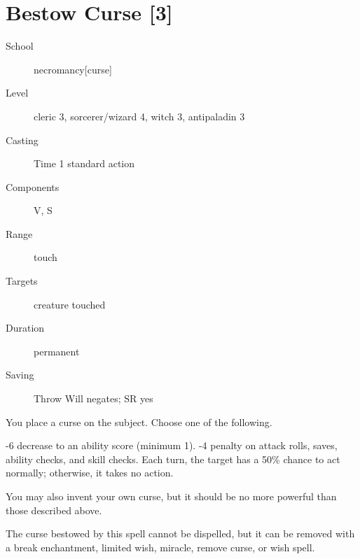 \documentclass[english]{article}
\begin{document}
\section*{Bestow Curse {[}3{]}}
\begin{description}
\item [{School}] necromancy{[}curse{]}
\item [{Level}] cleric 3, sorcerer/wizard 4, witch 3, antipaladin 3
\item [{Casting}] Time 1 standard action
\item [{Components}] V, S
\item [{Range}] touch
\item [{Targets}] creature touched
\item [{Duration}] permanent
\item [{Saving}] Throw Will negates; SR yes
\end{description}
You place a curse on the subject. Choose one of the following.

-6 decrease to an ability score (minimum 1). -4 penalty on attack
rolls, saves, ability checks, and skill checks. Each turn, the target
has a 50\% chance to act normally; otherwise, it takes no action.

You may also invent your own curse, but it should be no more powerful
than those described above.

The curse bestowed by this spell cannot be dispelled, but it can be
removed with a break enchantment, limited wish, miracle, remove curse,
or wish spell.

\end{document}

